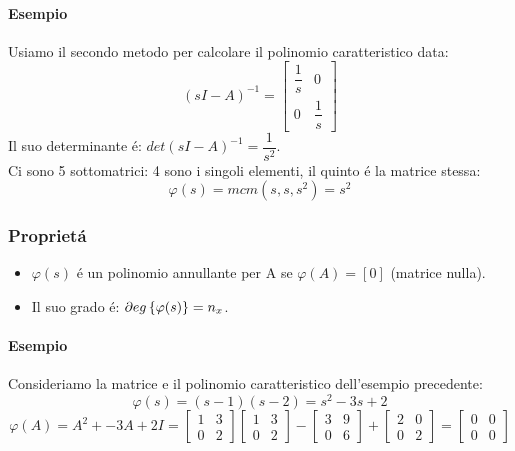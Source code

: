\documentclass[../main.tex]{subfiles}
\begin{document}
		\begin{mdframed}[style=Esempio]
			\paragraph{Esempio}
			Usiamo il secondo metodo per calcolare il polinomio caratteristico data:
			\[
				(sI-A)^{-1} =
				\begin{bmatrix}
					\dfrac{1}{s} & 0\\
					0 & \dfrac{1}{s}
				\end{bmatrix}
			\]
			Il suo determinante \'e: $ det (sI-A)^{-1} = \dfrac{1}{s^2} $.\\
			Ci sono 5 sottomatrici: 4 sono i singoli elementi, il quinto \'e la matrice stessa:
			\[
				\varphi(s) = mcm(s, s, s^2) = s^2
			\]
		\end{mdframed}
		
	\subsubsection{Propriet\'a}
		\begin{itemize}
			\item 
				$ \varphi(s) $ \'e un polinomio annullante per A se $ \varphi(A) = [0] $ (matrice nulla).
			\item 
				Il suo grado \'e: $ \partial eg \left\lbrace \varphi(s) \right\rbrace = n_x $.
		\end{itemize}
	
		\begin{mdframed}[style=Esempio]
			\paragraph{Esempio}
			Consideriamo la matrice e il polinomio caratteristico dell'esempio precedente:
			\[ 
				\varphi(s) = (s-1)(s-2) = s^2 - 3s + 2 
			\]
			\[ 
				\varphi(A) = A^2 + -3A + 2I = 
				\begin{bmatrix}
					1 & 3\\
					0 & 2
				\end{bmatrix}
				\begin{bmatrix}
					1 & 3\\
					0 & 2
				\end{bmatrix} -
				\begin{bmatrix}
					3 & 9\\
					0 & 6
				\end{bmatrix} +
				\begin{bmatrix}
					2 & 0\\
					0 & 2
				\end{bmatrix} =
				\begin{bmatrix}
					0 & 0\\
					0 & 0
				\end{bmatrix}
			\]
		\end{mdframed}
\end{document}
